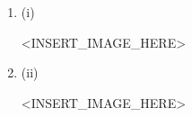 \item {} 
\begin{enumerate}
\item (i)
\noindent \begin{center}
<INSERT\_IMAGE\_HERE>
\par\end{center}
\item (ii)
\noindent \begin{center}
<INSERT\_IMAGE\_HERE>
\par\end{center}

\end{enumerate}